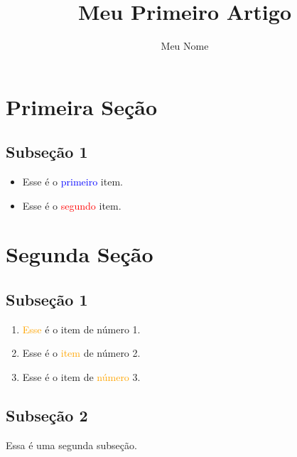 \documentclass[12pt,a4paper]{article}
\title{Meu Primeiro Artigo}
\author{Meu Nome}
\date{}
\begin{document}
	\maketitle              
	
	\section{Primeira Seção}
	
	\subsection{Subseção 1}
	\begin{itemize} %
		\item Esse é o \textcolor{blue}{primeiro} item.
		\item Esse é o \textcolor{red}{segundo} item.
	\end{itemize}
	
	\section{Segunda Seção}
	\label{sec2}

	\subsection{Subseção 1}
	\begin{enumerate} %
		\item \textcolor{orange}{Esse} é o item de número 1.
		\item Esse é o \textcolor{orange}{item} de número 2.
		\item Esse é o item de \textcolor{orange}{número} 3.
	\end{enumerate}

	\subsection{Subseção 2}
	Essa é uma segunda subseção.
	
\end{document}
